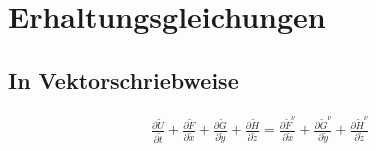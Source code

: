 \section{Erhaltungsgleichungen}
\subsection{In Vektorschriebweise}
\begin{align*}
\frac{\partial \tilde{U}}{\partial \tilde{t}}+\frac{\partial \tilde{F}}{\partial \tilde{x}}+\frac{\partial \tilde{G}}{\partial \tilde{y}}+\frac{\partial \tilde{H}}{\partial \tilde{z}}
=
\frac{\partial \tilde{F}^\nu}{\partial \tilde{x}}+\frac{\partial \tilde{G}^\nu}{\partial \tilde{y}}+\frac{\partial \tilde{H}^\nu}{\partial \tilde{z}}
\end{align*}

